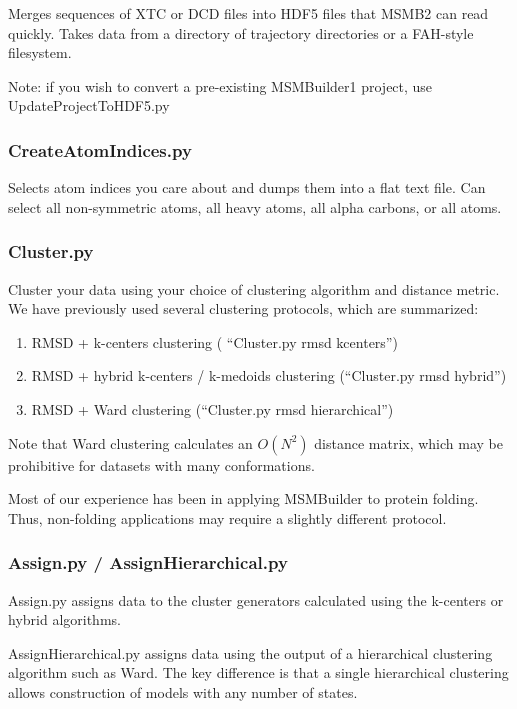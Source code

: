 \documentclass[12pt]{article}
\begin{document}
Merges sequences of XTC or DCD files into HDF5 files that MSMB2 can read quickly.  Takes data from a directory of trajectory directories or a FAH-style filesystem.  

Note: if you wish to convert a pre-existing MSMBuilder1 project, use UpdateProjectToHDF5.py 

\subsubsection{CreateAtomIndices.py}
Selects atom indices you care about and dumps them into a flat text file. Can select all non-symmetric atoms, all heavy atoms, all alpha carbons, or all atoms.

\subsubsection{Cluster.py}

Cluster your data using your choice of clustering algorithm and distance metric.  We have previously used several clustering protocols, which are summarized:

\begin{enumerate}
 \item RMSD + k-centers clustering \cite{Bowman2009c, Bowman2009a} ( ``Cluster.py  rmsd kcenters'')
 \item RMSD + hybrid k-centers / k-medoids clustering \cite{msmb2} (``Cluster.py  rmsd hybrid'')
 \item RMSD + Ward clustering \cite{beauchamp2012simple} (``Cluster.py  rmsd hierarchical'')
\end{enumerate}

Note that Ward clustering calculates an $O(N^2)$ distance matrix, which may be prohibitive for datasets with many conformations.  

Most of our experience has been in applying MSMBuilder to protein folding.  Thus, non-folding applications may require a slightly different protocol.

\subsubsection{Assign.py / AssignHierarchical.py}
Assign.py assigns data to the cluster generators calculated using the k-centers or hybrid algorithms.

AssignHierarchical.py assigns data using the output of a hierarchical clustering algorithm such as Ward.  The key difference is that a single hierarchical clustering allows construction of models with any number of states.
\end{document}
